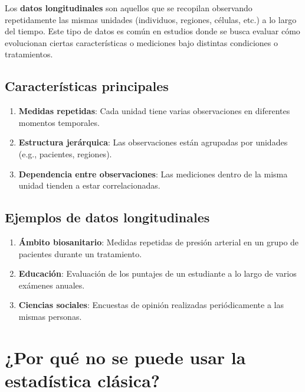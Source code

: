 \documentclass[
  letterpaper,
  DIV=11,
  numbers=noendperiod]{scrreprt}
\providecommand{\tightlist}{%
  \setlength{\itemsep}{0pt}\setlength{\parskip}{0pt}}\usepackage{longtable,booktabs,array}
\begin{document}
Los \textbf{datos longitudinales} son aquellos que se recopilan
observando repetidamente las mismas unidades (individuos, regiones,
células, etc.) a lo largo del tiempo. Este tipo de datos es común en
estudios donde se busca evaluar cómo evolucionan ciertas características
o mediciones bajo distintas condiciones o tratamientos.

\subsection{Características
principales}\label{caracteruxedsticas-principales}

\begin{enumerate}
\def\labelenumi{\arabic{enumi}.}
\tightlist
\item
  \textbf{Medidas repetidas}: Cada unidad tiene varias observaciones en
  diferentes momentos temporales.
\item
  \textbf{Estructura jerárquica}: Las observaciones están agrupadas por
  unidades (e.g., pacientes, regiones).
\item
  \textbf{Dependencia entre observaciones}: Las mediciones dentro de la
  misma unidad tienden a estar correlacionadas.
\end{enumerate}

\subsection{Ejemplos de datos
longitudinales}\label{ejemplos-de-datos-longitudinales}

\begin{enumerate}
\def\labelenumi{\arabic{enumi}.}
\tightlist
\item
  \textbf{Ámbito biosanitario}: Medidas repetidas de presión arterial en
  un grupo de pacientes durante un tratamiento.
\item
  \textbf{Educación}: Evaluación de los puntajes de un estudiante a lo
  largo de varios exámenes anuales.
\item
  \textbf{Ciencias sociales}: Encuestas de opinión realizadas
  periódicamente a las mismas personas.
\end{enumerate}

\section{¿Por qué no se puede usar la estadística
clásica?}\label{por-quuxe9-no-se-puede-usar-la-estaduxedstica-cluxe1sica}
\end{document}
